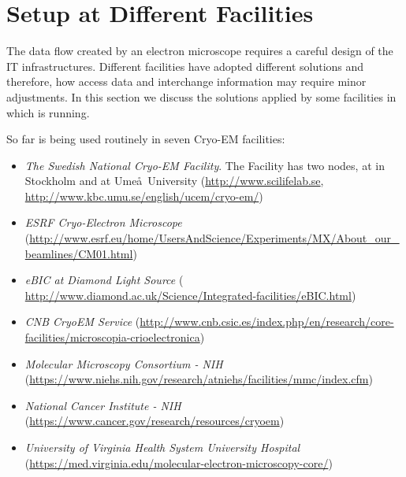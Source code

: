 \section{\scipion Setup at Different Facilities}

The data flow created by an electron microscope requires a careful design of the IT infrastructures.  Different facilities have adopted different solutions and therefore, how \scipion  access data and interchange information may require minor adjustments. In this section we discuss  the  solutions applied by some facilities in which \scipion is running.

So far \scipion is being used routinely in seven Cryo-EM facilities:
\begin{itemize}
 \itemsep0em 

 \item \emph{The Swedish National Cryo-EM Facility}. The Facility has two nodes, at \scilifelab in Stockholm and at Ume\aa\ University (\url{http://www.scilifelab.se}, \url{http://www.kbc.umu.se/english/ucem/cryo-em/})
 \item \emph{ESRF Cryo-Electron Microscope} (\url{http://www.esrf.eu/home/UsersAndScience/Experiments/MX/About_our_beamlines/CM01.html})
 \item \emph{eBIC at Diamond Light Source} ( \url{http://www.diamond.ac.uk/Science/Integrated-facilities/eBIC.html})
 \item \emph{CNB CryoEM Service} (\url{http://www.cnb.csic.es/index.php/en/research/core-facilities/microscopia-crioelectronica})
 \item \emph{Molecular Microscopy Consortium - NIH} (\url{https://www.niehs.nih.gov/research/atniehs/facilities/mmc/index.cfm})
 \item \emph{National Cancer Institute - NIH} (\url{https://www.cancer.gov/research/resources/cryoem})
 \item \emph{University of Virginia Health System University Hospital} (\url{https://med.virginia.edu/molecular-electron-microscopy-core/})
 
\end{itemize}

